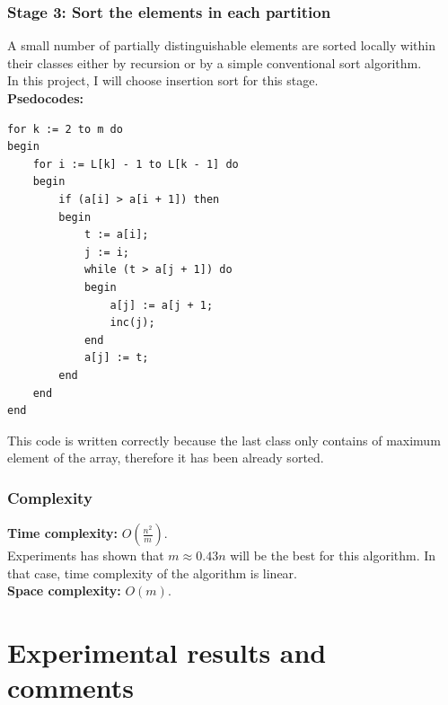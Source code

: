\documentclass[12pt,a4paper]{article}
\begin{document}
\subsubsection{Stage 3: Sort the elements in each partition}
A small number of partially distinguishable elements are sorted locally within their classes either by recursion or by a simple conventional sort algorithm. \cite{flashsort}\\
In this project, I will choose insertion sort for this stage.\\
\textbf{Psedocodes:} \cite{thayP}
\lstset{language=Pascal} 
\begin{lstlisting}[caption = {Flash sort - stage 3}]
for k := 2 to m do
begin
	for i := L[k] - 1 to L[k - 1] do
	begin
		if (a[i] > a[i + 1]) then
		begin
			t := a[i];
			j := i;
			while (t > a[j + 1]) do
			begin
				a[j] := a[j + 1;
				inc(j);
			end
			a[j] := t;
		end
	end
end
\end{lstlisting}
This code is written correctly because the last class only contains of maximum element of the array, therefore it has been already sorted.
\subsubsection{Complexity}
\textbf{Time complexity:} $O \left( {\frac{n^2}{m}} \right).$\\
Experiments has shown that $m \approx 0.43n$ will be the best for this algorithm. In that case, time complexity of the algorithm is linear. \cite{thayP}\\
\textbf{Space complexity:} $O \left( m \right).$

\newpage

\section{Experimental results and comments}
\end{document}
